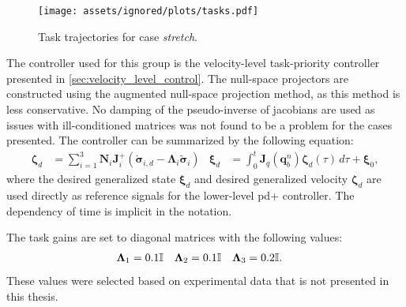 \begin{figure}[!ht]
    \centering
    \texttt{[image: assets/ignored/plots/tasks.pdf]}
    \caption{Task trajectories for case \textit{stretch}.}
    \label{fig:eelume:tpc:tasks:stretch}
\end{figure}

The controller used for this group is the velocity-level task-priority controller
presented in \autoref{sec:velocity_level_control}.
The null-space projectors are constructed using the augmented null-space projection method,
as this method is less conservative.
No damping of the pseudo-inverse of jacobians
are used as issues with ill-conditioned matrices was not found to be a problem for the cases presented.
The controller can be summarized by the following equation:
\begin{subequations}
\begin{align}
    \bm{\zeta}_d &= \sum_{i=1}^{3} \bm{N}_{i} \bm{J}_i^{+} \left( \dot{\bm{\sigma}}_{i,d} - \bm{\Lambda}_i \tilde{\bm{\sigma}}_i\right)  &
    \bm{\xi}_d &= \int_0^t \bm{J}_q(\bm{q}_b^n)\bm{\zeta}_d(\tau) \, d\tau + \bm{\xi}_0,
\end{align}
\end{subequations}
where the desired generalized state \(\bm{\xi}_d\) and desired generalized velocity \(\bm{\zeta}_d\)
are used directly as reference signals for the lower-level \gls{pd+} controller.
The dependency of time is implicit in the notation.

The task gains are set to diagonal matrices with the following values:
\begin{align}
    \bm{\Lambda}_1 &= 0.1 \mathbb{I} &
    \bm{\Lambda}_2 &= 0.1 \mathbb{I} &
    \bm{\Lambda}_3 &= 0.2 \mathbb{I}.
\end{align}
These values were selected based on experimental data that is not presented in this thesis.


